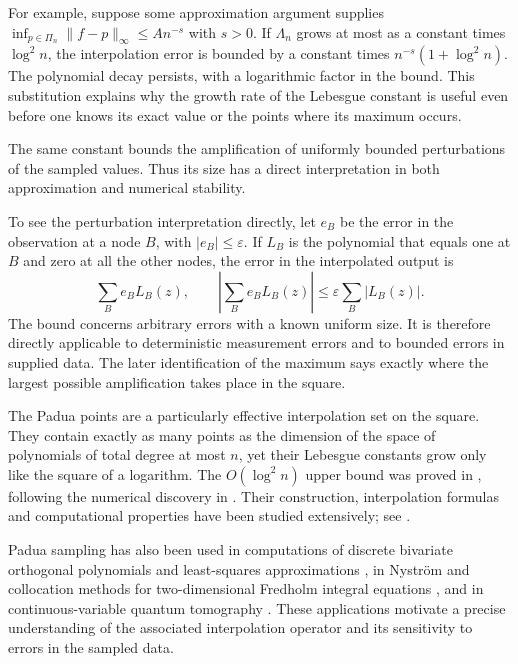 For example, suppose some approximation argument supplies
$\inf_{p\in\Pi_n}\|f-p\|_\infty\leq A n^{-s}$ with $s>0$.
If $\Lambda_n$ grows at most as a constant times $\log^2 n$, the
interpolation error is bounded by a constant times
$n^{-s}(1+\log^2 n)$. The polynomial decay persists, with a logarithmic
factor in the bound. This substitution explains why the growth
rate of the Lebesgue constant is useful even before one knows its exact
value or the points where its maximum occurs.

The same constant bounds the amplification of uniformly bounded perturbations
of the sampled values. Thus its size has a direct interpretation in both
approximation and numerical stability.

To see the perturbation interpretation directly, let $e_B$ be the error
in the observation at a node $B$, with $|e_B|\leq\varepsilon$. If $L_B$
is the polynomial that equals one at $B$ and zero at all the other nodes,
the error in the interpolated output is
\[
 \sum_B e_B L_B(z),\qquad
 \left|\sum_B e_B L_B(z)\right|
       \leq\varepsilon\sum_B|L_B(z)|.
\]
The bound concerns arbitrary errors with a known uniform size. It is
therefore directly applicable to deterministic measurement errors and
to bounded errors in supplied data. The later identification of the
maximum says exactly where the largest possible amplification takes
place in the square.

The Padua points are a particularly effective interpolation set on the square.
They contain exactly as many points as the dimension of the space of
polynomials of total degree at most $n$, yet their Lebesgue constants grow
only like the square of a logarithm. The $O(\log^2 n)$ upper bound was proved in
\cite{BosCaliariDeMarchiVianelloXu2006}, following the numerical discovery
in \cite{CaliariDeMarchiVianello2005}. Their construction, interpolation
formulas and computational properties have been studied extensively;
see \cite{CaliariDeMarchiVianello2005,BosCaliariDeMarchiVianelloXu2006,
BosDeMarchiVianelloXu2007,Computational2008,DeMarchi2022}.

Padua sampling has also been used in computations of discrete bivariate
orthogonal polynomials and least-squares approximations
\cite{VanBarelChesnokov2010}, in Nystr\"om and collocation methods for
two-dimensional Fredholm integral equations \cite{LaguardiaRusso2022}, and in
continuous-variable quantum tomography \cite{LandonCardinalGoviaClerk2018}.
These applications motivate a precise understanding of the associated
interpolation operator and its sensitivity to errors in the sampled data.

